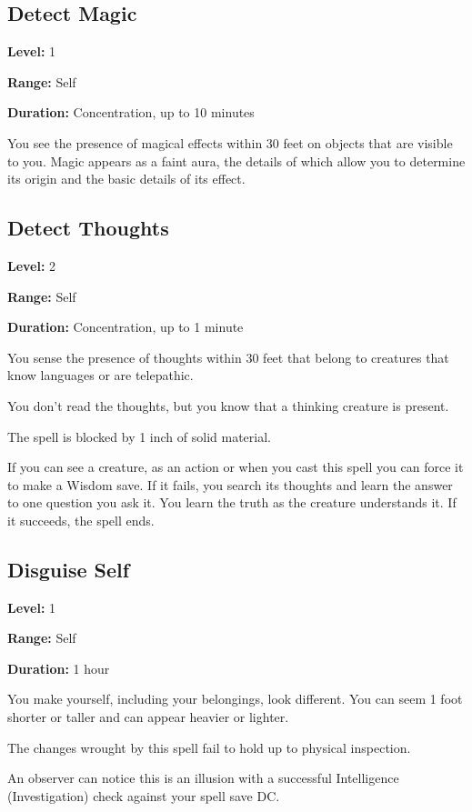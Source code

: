 \documentclass[12pt,letterpaper,twocolumn,openany,nodeprecatedcode,bg=none]{dndbook}
\let\oldsubsection\subsection
\renewcommand{\subsection}[1]{%
  \needspace{5\baselineskip}%
  \oldsubsection{#1}%
}
\begin{document}
\subsection{Detect Magic}\label{detect-magic}

\textbf{Level:} 1

\textbf{Range:} Self

\textbf{Duration:} Concentration, up to 10 minutes

You see the presence of magical effects within 30 feet on objects that
are visible to you. Magic appears as a faint aura, the details of which
allow you to determine its origin and the basic details of its effect.

\subsection{Detect Thoughts}\label{detect-thoughts}

\textbf{Level:} 2

\textbf{Range:} Self

\textbf{Duration:} Concentration, up to 1 minute

You sense the presence of thoughts within 30 feet that belong to
creatures that know languages or are telepathic.

You don't read the thoughts, but you know that a thinking creature is
present.

The spell is blocked by 1 inch of solid material.

If you can see a creature, as an action or when you cast this spell you
can force it to make a Wisdom save. If it fails, you search its thoughts
and learn the answer to one question you ask it. You learn the truth as
the creature understands it. If it succeeds, the spell ends.

\subsection{Disguise Self}\label{disguise-self}

\textbf{Level:} 1

\textbf{Range:} Self

\textbf{Duration:} 1 hour

You make yourself, including your belongings, look different. You can
seem 1 foot shorter or taller and can appear heavier or lighter.

The changes wrought by this spell fail to hold up to physical
inspection.

An observer can notice this is an illusion with a successful
Intelligence (Investigation) check against your spell save DC.
\end{document}
